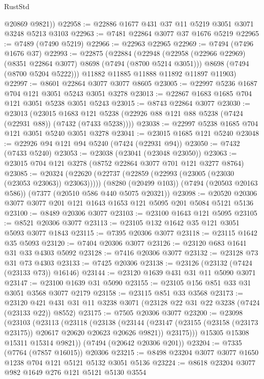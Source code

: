 \begin{lexlean}{RustStd}
\begin{coremodule}
        @20869
        @9821))
@22958 := @22886 @1677 @431 @37 @11 @5219 @3051 @3071 @3248 @5213 @3103
@22963 := @7481 @22864 @3077 @37 @1676 @5219
@22965 := @7489 (@7490 @5219)
@22966 := @22963 @22965
@22969 := @7494 (@7496 @1676 @37)
@22993 := @22875
    (@22884
      (@22948
        (@22958 (@22966 @22969) (@8351 @22864 @3077) @8698 (@7494 (@8700 @5214 @3051)))
        @8698
        (@7494 (@8700 @5204 @5222)))
      @11882
      @11885
      @11888
      @11892
      @11897
      @11903)
@22997 := @8601 @22864 @3077 @3077 @8605
@23005 := @22997 @5236 @1687 @704 @121 @3051 @5243 @3051 @3278
@23013 := @22867 @1683 @1685 @704 @121 @3051 @5238 @3051 @5243
@23015 := @8743 @22864 @3077
@23030 := @23013
    (@23015 @1683 @121 @5238 (@22926 @88 @121 @88 @5238 (@7424 (@22931 @88)) (@7432 (@7433 @5238))))
@23038 := @22997 @5238 @1685 @704 @121 @3051 @5240 @3051 @3278
@23041 := @23015 @1685 @121 @5240
@23048 := @22926 @94 @121 @94 @5240 (@7424 (@22931 @94))
@23050 := @7432 (@7433 @5240)
@23053 := @23038 (@23041 (@23048 @23050))
@23063 := @23015 @704 @121 @3278 (@8752 @22864 @3077 @701 @121 @3277 @8764)
@23085 := @20324
    (@22620 (@22737 (@22859 (@22993 (@23005 (@23030 (@23053 @23063)) @23063)))))
    (@8280 (@20499 @103))
    (@7494 (@20503 @20163 @586))
    (@7377 (@20510 @586 @440 @5075 @20321))
@23098 := @20520 @20306 @3077 @3077 @201 @121 @1643 @1653 @121 @5095 @201 @5084 @5121 @5136
@23100 := @8489 @20306 @3077
@23103 := @23100 @1643 @121 @5095
@23105 := @8521 @20306 @3077
@23113 := @23105 @132 @1642 @35 @121 @3051 @5093 @3077 @1843
@23115 := @7395 @20306 @3077
@23118 := @23115 @1642 @35 @5093
@23120 := @7404 @20306 @3077
@23126 := @23120 @683 @1641 @31 @33 @4303 @5092
@23128 := @7416 @20306 @3077
@23132 := @23128 @73 @31 @73 @4303
@23133 := @7425 @20306
@23138 := @23126 (@23132 (@7424 (@23133 @73)) @16146)
@23144 := @23120 @1639 @431 @31 @11 @5090 @3071
@23147 := @23100 @1639 @31 @5090
@23155 := @23105 @156 @851 @33 @31 @3051 @3568 @3077 @2179
@23158 := @23115 @851 @33 @3568
@23173 := @23120 @421 @431 @31 @11 @3238 @3071 (@23128 @22 @31 @22 @3238 (@7424 (@23133 @22)) @8552)
@23175 := @7505 @20306 @3077
@23200 := @23098
    (@23103
      (@23113
        (@23118
          (@23138
            (@23144
              (@23147 (@23155 (@23158 (@23173 @23175)) @20617 @20620 @20623 @20626 @9821))
              @23175)))
        @15305
        @15308
        @15311
        @15314
        @9821))
    (@7494 (@20642 @20306 @201))
@23204 := @7335 (@7764 (@7857 @16015)) @20306
@23215 := @8498 @23204 @3077 @3077 @1650 @1238 @704 @121 @5121 @5132 @3051 @5136
@23224 := @8618 @23204 @3077 @982 @1649 @276 @121 @5121 @5130 @3554

\end{coremodule}
\end{lexlean}
